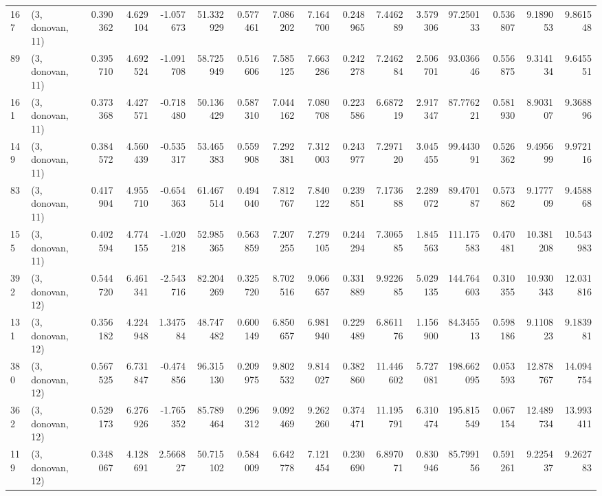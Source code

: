 \begin{tabular}{llrrrrrrrrrrrrrr}
167 &  (3, donovan, 11) &   0.390362 &   4.629104 &  -1.057673 &    51.332929 &   0.577461 &   7.086202 &   7.164700 &  0.248965 &   7.446289 &   3.579306 &    97.250133 &  0.536807 &   9.189053 &   9.861548 \\
89  &  (3, donovan, 11) &   0.395710 &   4.692524 &  -1.091708 &    58.725949 &   0.516606 &   7.585125 &   7.663286 &  0.242278 &   7.246284 &   2.506701 &    93.036646 &  0.556875 &   9.314134 &   9.645551 \\
161 &  (3, donovan, 11) &   0.373368 &   4.427571 &  -0.718480 &    50.136429 &   0.587310 &   7.044162 &   7.080708 &  0.223586 &   6.687219 &   2.917347 &    87.776221 &  0.581930 &   8.903107 &   9.368896 \\
149 &  (3, donovan, 11) &   0.384572 &   4.560439 &  -0.535317 &    53.465383 &   0.559908 &   7.292381 &   7.312003 &  0.243977 &   7.297120 &   3.045455 &    99.443091 &  0.526362 &   9.495699 &   9.972116 \\
83  &  (3, donovan, 11) &   0.417904 &   4.955710 &  -0.654363 &    61.467514 &   0.494040 &   7.812767 &   7.840122 &  0.239851 &   7.173688 &   2.289072 &    89.470187 &  0.573862 &   9.177709 &   9.458868 \\
155 &  (3, donovan, 11) &   0.402594 &   4.774155 &  -1.020218 &    52.985365 &   0.563859 &   7.207255 &   7.279105 &  0.244294 &   7.306585 &   1.845563 &   111.175583 &  0.470481 &  10.381208 &  10.543983 \\
392 &  (3, donovan, 12) &   0.544720 &   6.461341 &  -2.543716 &    82.204269 &   0.325720 &   8.702516 &   9.066657 &  0.331889 &   9.922685 &   5.029135 &   144.764603 &  0.310355 &  10.930343 &  12.031816 \\
131 &  (3, donovan, 12) &   0.356182 &   4.224948 &   1.347584 &    48.747482 &   0.600149 &   6.850657 &   6.981940 &  0.229489 &   6.861176 &   1.156900 &    84.345513 &  0.598186 &   9.110823 &   9.183981 \\
380 &  (3, donovan, 12) &   0.567525 &   6.731847 &  -0.474856 &    96.315130 &   0.209975 &   9.802532 &   9.814027 &  0.382860 &  11.446602 &   5.727081 &   198.662095 &  0.053593 &  12.878767 &  14.094754 \\
362 &  (3, donovan, 12) &   0.529173 &   6.276926 &  -1.765352 &    85.789464 &   0.296312 &   9.092469 &   9.262260 &  0.374471 &  11.195791 &   6.310474 &   195.815549 &  0.067154 &  12.489734 &  13.993411 \\
119 &  (3, donovan, 12) &   0.348067 &   4.128691 &   2.566827 &    50.715102 &   0.584009 &   6.642778 &   7.121454 &  0.230690 &   6.897071 &   0.830946 &    85.799156 &  0.591261 &   9.225437 &   9.262783 \\

\end{tabular}
